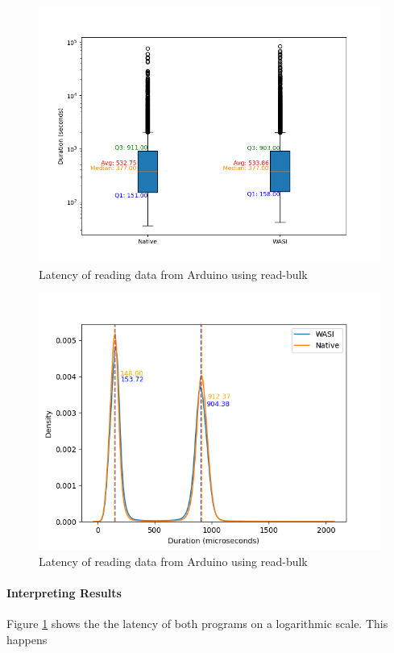 \begin{figure}[H]
  \centering
  \includegraphics[width=1\textwidth]{images/arduino_latency_boxplot.png}
  \caption{Latency of reading data from Arduino using read-bulk}
  \label{fig:arduino_reading_latency_boxplot}
\end{figure}

\begin{figure}[H]
  \centering
  \includegraphics[width=1\textwidth]{images/reading_data_latency.png}
  \caption{Latency of reading data from Arduino using read-bulk}
  \label{fig:arduino_reading_latency}
\end{figure}




\paragraph{Interpreting Results}
Figure \ref{fig:arduino_reading_latency_boxplot} shows the the latency of both programs on a logarithmic scale. This happens

